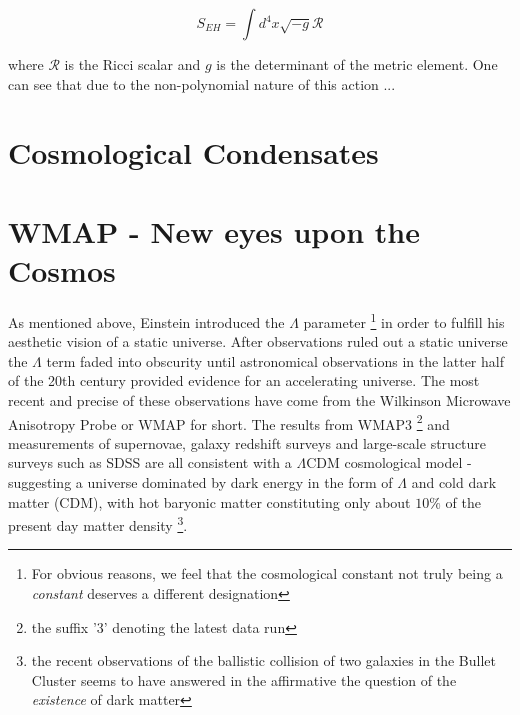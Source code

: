 \documentclass[11pt,english,rmp]{revtex4}
\begin{document}
\begin{equation}
S_{EH}=\int d^{4}x\sqrt{-g}\mathcal{R}\label{eqn:EinsteinHilbert}\end{equation}


where $\mathcal{R}$ is the Ricci scalar and $g$ is the determinant
of the metric element. One can see that due to the non-polynomial
nature of this action ...


\section{Cosmological Condensates}


\section{WMAP - New eyes upon the Cosmos}

As mentioned above, Einstein introduced the $\Lambda$ parameter %
\footnote{For obvious reasons, we feel that the \textquotedbl{}cosmological
constant\textquotedbl{} not truly being a \emph{constant} deserves
a different designation%
} in order to fulfill his aesthetic vision of a static universe. After
observations ruled out a static universe the $\Lambda$ term faded
into obscurity until astronomical observations in the latter half
of the 20th century provided evidence for an accelerating universe.
The most recent and precise of these observations have come from the
Wilkinson Microwave Anisotropy Probe or WMAP for short. The results
from WMAP3%
\footnote{the suffix '3' denoting the latest data run%
} and measurements of supernovae, galaxy redshift surveys and large-scale
structure surveys such as SDSS are all consistent with a $\Lambda$CDM
cosmological model - suggesting a universe dominated by dark energy
in the form of $\Lambda$ and cold dark matter (CDM), with hot baryonic
matter constituting only about $10\%$ of the present day matter density%
\footnote{the recent observations of the ballistic collision of two galaxies
in the Bullet Cluster seems to have answered in the affirmative the
question of the \emph{existence} of dark matter%
}.
\end{document}
